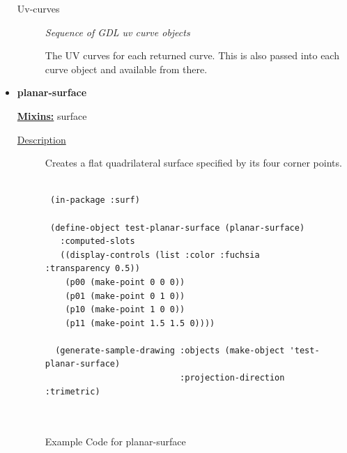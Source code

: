 \documentclass [11pt]{book}
\begin{document}
\begin{itemize}
\begin{description}
\item [Uv-curves]
\emph{Sequence of GDL uv curve objects}

 The UV curves for each returned curve. This is also passed into each
curve object and available from there.




\end{description}







\item {}
\label{prim:planar-surface}
\textbf{planar-surface}


\textbf{
\underline{Mixins:}} surface





\begin{description}

\item [
\underline{Description}]


Creates a flat quadrilateral surface specified by its four corner points.



\end{description}




\begin{figure}
\begin{lrbox}{\boxedverb}
\begin{minipage}{\linewidth}
{\small

\begin{verbatim}

 (in-package :surf)

 (define-object test-planar-surface (planar-surface)
   :computed-slots
   ((display-controls (list :color :fuchsia :transparency 0.5))
    (p00 (make-point 0 0 0))
    (p01 (make-point 0 1 0))
    (p10 (make-point 1 0 0))
    (p11 (make-point 1.5 1.5 0))))

  (generate-sample-drawing :objects (make-object 'test-planar-surface)
                           :projection-direction :trimetric)



\end{verbatim}}
\end{minipage}
\end{lrbox}
\fbox{\usebox{\boxedverb}}

\caption{Example Code for planar-surface}


\end{figure}
\end{itemize}
\end{document}
